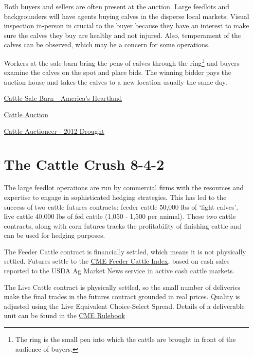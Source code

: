\documentclass[
  letterpaper,
  DIV=11,
  numbers=noendperiod]{scrreprt}
\begin{document}
Both buyers and sellers are often present at the auction. Large feedlots
and backgrounders will have agents buying calves in the disperse local
markets. Visual inspection in-person in crucial to the buyer because
they have an interest to make sure the calves they buy are healthy and
not injured. Also, temperament of the calves can be observed, which may
be a concern for some operations.

Workers at the sale barn bring the pens of calves through the
ring\footnote{The ring is the small pen into which the cattle are
  brought in front of the audience of buyers.} and buyers examine the
calves on the spot and place bids. The winning bidder pays the auction
house and takes the calves to a new location usually the same day.

\href{https://www.youtube.com/watch?v=m0iiTk3MQ3k}{Cattle Sale Barn -
America's Heartland}

\href{https://www.youtube.com/watch?v=ACKT5jWJHTI}{Cattle Auction}

\href{https://www.youtube.com/watch?v=Ig514nyWQho}{Cattle Auctioneer -
2012 Drought}

\section{The Cattle Crush 8-4-2}\label{the-cattle-crush-8-4-2}

The large feedlot operations are run by commercial firms with the
resources and expertise to engage in sophisticated hedging strategies.
This has led to the success of two cattle futures contracts: feeder
cattle 50,000 lbs of `light calves', live cattle 40,000 lbs of fed
cattle (1,050 - 1,500 per animal). These two cattle contracts, along
with corn futures tracks the profitability of finishing cattle and can
be used for hedging purposes.

The Feeder Cattle contract is financially settled, which means it is not
physically settled. Futures settle to the
\href{http://www.cmegroup.com/market-data/reports/cash-settled-commodity-index-prices.html}{CME
Feeder Cattle Index}, based on cash sales reported to the USDA Ag Market
News service in active cash cattle markets.

The Live Cattle contract is physically settled, so the small number of
deliveries make the final trades in the futures contract grounded in
real prices. Quality is adjusted using the Live Equivalent Choice-Select
Spread. Details of a deliverable unit can be found in the
\href{http://www.cmegroup.com/rulebook/CME/II/100/101/101.pdf}{CME
Rulebook}
\end{document}
